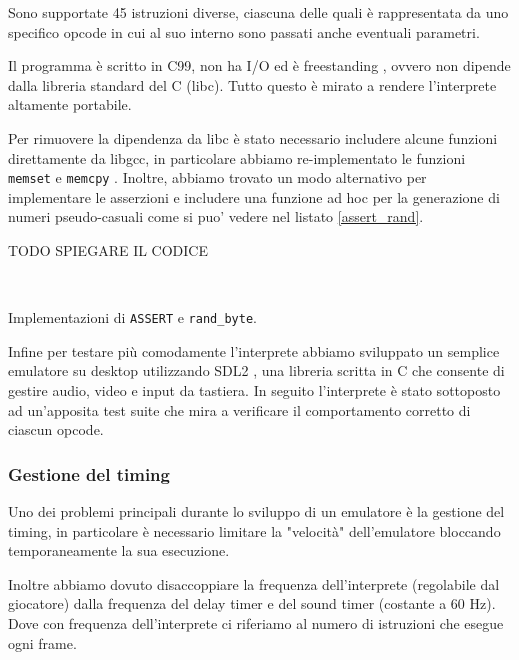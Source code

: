 \documentclass[a4paper]{article}
\begin{document}
Sono supportate 45 istruzioni diverse, ciascuna delle
quali è rappresentata da uno specifico opcode in cui al suo interno
sono passati anche eventuali parametri.

Il programma è scritto in C99, non ha I/O ed è freestanding
\cite{n1256:conformance}, ovvero non dipende dalla libreria
standard del C (libc). Tutto questo è mirato a rendere l'interprete
altamente portabile.

Per rimuovere la dipendenza da libc è stato necessario includere alcune funzioni direttamente da libgcc, in particolare abbiamo re-implementato le funzioni \texttt{memset} e \texttt{memcpy} . Inoltre, abbiamo trovato un modo alternativo per implementare le asserzioni e includere una funzione ad hoc per la generazione di numeri pseudo-casuali come si puo' vedere nel listato \ref{assert_rand}.

TODO SPIEGARE IL CODICE

\begin{Listing}[h!t]
    \centering
    \mbox{
        \quad
    }
    \caption{Implementazioni di \texttt{ASSERT} e \texttt{rand\_byte}.}
    \label{assert_rand}
\end{Listing}

Infine per testare più comodamente l'interprete abbiamo sviluppato un semplice emulatore su desktop utilizzando SDL2 \cite{libsdl:about}, una libreria scritta in C che consente di gestire audio, video e input da tastiera. In seguito l'interprete è stato sottoposto ad un'apposita test suite \cite{github:chip8-test-suite} che mira a verificare il comportamento corretto di ciascun opcode.

\subsubsection{Gestione del timing}

Uno dei problemi principali durante lo sviluppo di un emulatore è la gestione del timing, in particolare è necessario limitare la "velocità" dell'emulatore bloccando temporaneamente la sua esecuzione.

Inoltre abbiamo dovuto disaccoppiare la frequenza dell'interprete (regolabile dal giocatore) dalla frequenza del delay timer e del sound timer (costante a 60 Hz). Dove con frequenza dell'interprete ci riferiamo al numero di istruzioni che esegue ogni frame.

\end{document}
